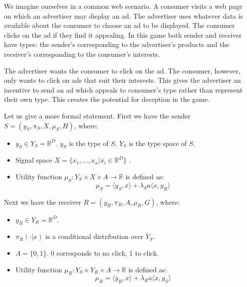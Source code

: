 \documentclass{article}
\begin{document}
We imagine ourselves in a common web scenario. A consumer visits a web page on which an advertiser may display an ad. The advertiser uses whatever data is available about the consumer to choose an ad to be displayed. The consumer clicks on the ad if they find it appealing. In this game both sender and receiver have types: the sender's corresponding to the advertiser's products and the receiver's corresponding to the consumer's interests.

The advertiser wants the consumer to click on the ad. The consumer, however, only wants to click on ads that suit their interests. This gives the advertiser an incentive to send an ad which appeals to consumer's type rather than represent their own type. This creates the potential for deception in the game.

Let us give a more formal statement. First we have the sender $S = (y_S, \pi_S, X, \mu_S, H)$, where:
\begin{itemize}
    \item $y_S \in Y_S = \mathbb{R}^D$. $y_S$ is the type of $S$. $Y_S$ is the type space of $S$.
    \item Signal space $X = \lbrace x_1, ..., x_n \vert x_i \in \mathbb{R}^D \rbrace$ .
    \item Utility function $\mu_S: Y_S \times X \times A \rightarrow \mathbb{R}$ is defined as:
    \begin{equation}
        \mu_S = \langle y_S, x \rangle + \lambda_S a \langle x, y_R \rangle
    \end{equation}
\end{itemize}

\noindent Next we have the receiver $R = (y_R, \pi_R, A, \mu_R, G)$, where:
\begin{itemize}
    \item $y_R \in Y_R = \mathbb{R}^D$.
    \item $\pi_R(\cdot|x)$ is a conditional distribution over $Y_S$.
    \item $A = \lbrace 0,1 \rbrace$. 0 corresponds to no click, 1 to click.
    \item Utility function $\mu_R: Y_S \times Y_R \times A \rightarrow \mathbb{R}$ is defined as:
    \begin{equation}
        \mu_R = \langle y_R, x \rangle + \lambda_R a \langle x, y_S \rangle
    \end{equation}
\end{itemize}
\end{document}
